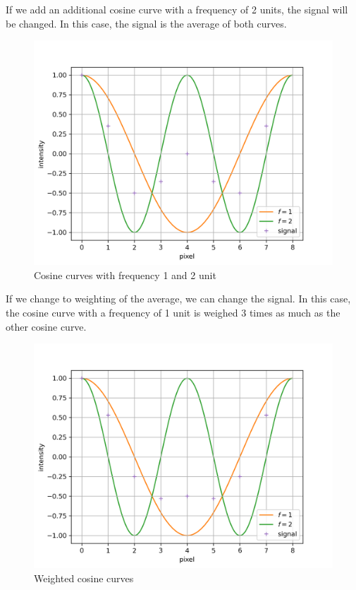 \documentclass{article}
\begin{document}
If we add an additional cosine curve with a frequency of 2 units, the signal will be changed.
In this case, the signal is the average of both curves.
\begin{figure}[h]
	\centering
	\includegraphics[width=\textwidth]{./figures/dct/cos2}
	\caption{Cosine curves with frequency 1 and 2 unit}
	\label{fig:cos2}
\end{figure}

If we change to weighting of the average, we can change the signal.
In this case, the cosine curve with a frequency of 1 unit is weighed 3 times as much as the other cosine curve.
\begin{figure}[h]
	\centering
	\includegraphics[width=\textwidth]{./figures/dct/cos3}
	\caption{Weighted cosine curves}
	\label{fig:cos3}
\end{figure}
\end{document}
